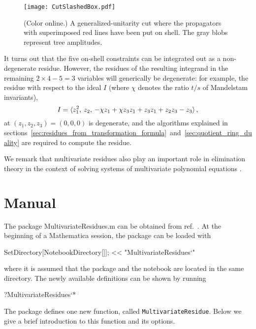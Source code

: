 \documentclass[dvipsnames,preprint,12pt,sort&compress]{elsarticle}
\newcommand{\Math}[1]
{\lstinline[style=Mathematica,breaklines=false,basicstyle=\small \ttfamily\null]~#1~}
\begin{document}
\begin{figure}[!h]
\begin{center}
\texttt{[image: CutSlashedBox.pdf]}
\caption{(Color online.) A generalized-unitarity cut where the propagators with superimposed
red lines have been put on shell. The gray blobs represent tree amplitudes.}
\label{fig:cut_slashed_box}
\end{center}
\end{figure}

It turns out that the five on-shell constraints can be integrated out as a
non-degenerate residue. However, the residues of the resulting integrand in
the remaining $2 \times 4 - 5 = 3$ variables will generically be degenerate: for example,
the residue with respect to the ideal $I$ (where $\chi$ denotes the ratio $t/s$
of Mandelstam invariants),
\begin{equation}
I = \langle z_1^2, \hspace{0.7mm} z_2, \hspace{0.7mm} -\chi z_1+\chi z_3 z_1+z_3 z_1+z_2 z_3-z_3 \rangle \,,
\end{equation}
at $(z_1,z_2,z_3)= (0,0,0)$ is degenerate, and the algorithms explained in
sections~\ref{sec:residues_from_transformation_formula}~and~\ref{sec:quotient_ring_duality}
are required to compute the residue.

We remark that multivariate residues also play an important role
in elimination theory in the context of solving systems of
multivariate polynomial equations \cite{CattaniDickenstein}.


\section{Manual}\label{sec:manual}

The package MultivariateResidues.m can be obtained from ref.~\cite{webpage}.
At the beginning of a Mathematica session, the package can be loaded with
\begin{CodeSample}
SetDirectory[NotebookDirectory[]];
<< "MultivariateResidues`"
\end{CodeSample}
where it is assumed that the package and the notebook are located in the same directory.
The newly available definitions can be shown by running
\begin{CodeSample}
?MultivariateResidues`*
\end{CodeSample}
The package defines one new function, called \Math{MultivariateResidue}.
Below we give a brief introduction to this function and its options.
\end{document}
